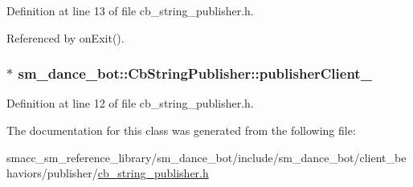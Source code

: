 Definition at line 13 of file cb\+\_\+string\+\_\+publisher.\+h.



Referenced by on\+Exit().

\subsubsection[{\texorpdfstring{publisher\+Client\+\_\+}{publisherClient_}}]{$\ast$ sm\+\_\+dance\+\_\+bot\+::\+Cb\+String\+Publisher\+::publisher\+Client\+\_\+}\hypertarget{classsm__dance__bot_1_1CbStringPublisher_a18e8333d818203fbbb6e53b0c3fb5035}{}\label{classsm__dance__bot_1_1CbStringPublisher_a18e8333d818203fbbb6e53b0c3fb5035}


Definition at line 12 of file cb\+\_\+string\+\_\+publisher.\+h.



The documentation for this class was generated from the following file\+:\begin{DoxyCompactItemize}
\item 
smacc\+\_\+sm\+\_\+reference\+\_\+library/sm\+\_\+dance\+\_\+bot/include/sm\+\_\+dance\+\_\+bot/client\+\_\+behaviors/publisher/\hyperlink{cb__string__publisher_8h}{cb\+\_\+string\+\_\+publisher.\+h}\end{DoxyCompactItemize}
